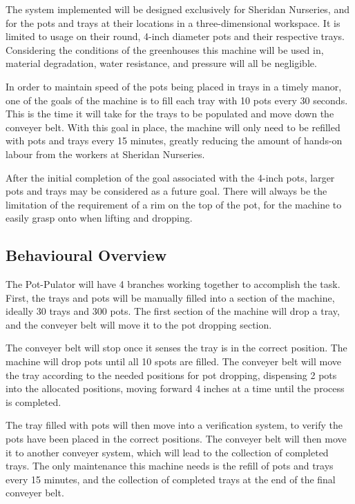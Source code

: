 \documentclass[12pt]{article}
\begin{document}
\noindent The system implemented will be designed exclusively for Sheridan Nurseries, and for the pots and trays at their locations in a three-dimensional workspace. It is limited to usage on their round, 4-inch diameter pots and their respective trays. Considering the conditions of the greenhouses this machine will be used in, material degradation, water resistance, and pressure will all be negligible. 

\noindent In order to maintain speed of the pots being placed in trays in a timely manor, one of the goals of the machine is to fill each tray with 10 pots every 30 seconds. This is the time it will take for the trays to be populated and move down the conveyer belt. With this goal in place, the machine will only need to be refilled with pots and trays every 15 minutes, greatly reducing the amount of hands-on labour from the workers at Sheridan Nurseries. 

\noindent After the initial completion of the goal associated with the 4-inch pots, larger pots and trays may be considered as a future goal. There will always be the limitation of the requirement of a rim on the top of the pot, for the machine to easily grasp onto when lifting and dropping. 


\subsection{Behavioural Overview}
The Pot-Pulator will have 4 branches working together to accomplish the task. First, the trays and pots will be manually filled into a section of the machine, ideally 30 trays and 300 pots. The first section of the machine will drop a tray, and the conveyer belt will move it to the pot dropping section. 

\noindent The conveyer belt will stop once it senses the tray is in the correct position. The machine will drop pots until all 10 spots are filled. The conveyer belt will move the tray according to the needed positions for pot dropping, dispensing 2 pots into the allocated positions, moving forward 4 inches at a time until the process is completed. 

\noindent The tray filled with pots will then move into a verification system, to verify the pots have been placed in the correct positions. The conveyer belt will then move it to another conveyer system, which will lead to the collection of completed trays. The only maintenance this machine needs is the refill of pots and trays every 15 minutes, and the collection of completed trays at the end of the final conveyer belt. 
\end{document}
